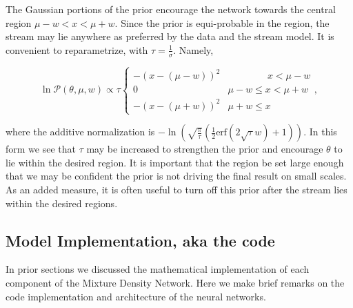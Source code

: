 \documentclass[twocolumn]{aastex631}
\newcommand{\mcal}[1]{\mathcal{#1}}
\newcommand{\pdf}{\mcal{P}}
\begin{document}
            The Gaussian portions of the prior encourage the network towards the
            central region $\mu - w < x < \mu + w$. Since the prior is
            equi-probable in the region, the stream may lie anywhere as
            preferred by the data and the stream model.  It is convenient to
            reparametrize, with $\tau = \frac{1}{\sigma}$. Namely,
            \begin{small}
            \begin{equation}
                \ln \pdf(\theta,\mu,w) \propto \tau \begin{cases} 
                    -\left(x-(\mu-w)\right)^2 & \phantom{\mu - w <}\ x < \mu - w \\
                    0 & \mu - w \leq x < \mu + w \\
                    -\left(x-(\mu+w)\right)^2 & \mu + w \leq x
                \end{cases},
            \end{equation}\end{small}
            where the additive normalization is
            $-\ln\left(\sqrt{\frac{\pi}{\tau}}
            \left(\frac{1}{2}\text{erf}\left(2 \sqrt{\tau }
            w\right)+1\right)\right)$. In this form we see that $\tau$ may be
            increased to strengthen the prior and encourage $\theta$ to lie
            within the desired region. It is important that the region be set
            large enough that we may be confident the prior is not driving the
            final result on small scales. As an added measure, it is often
            useful to turn off this prior after the stream lies within the
            desired regions.



    \vspace{5pt}
    \subsection{Model Implementation, aka the code} \label{sub:methods:model_implementation}

        In prior sections we discussed the mathematical implementation of each
        component of the Mixture Density Network. Here we make brief remarks on
        the code implementation and architecture of the neural networks.
\end{document}
